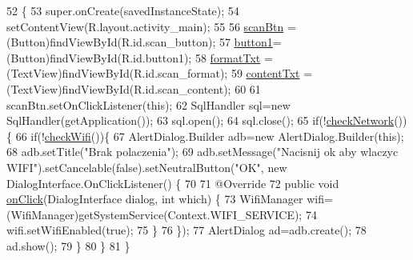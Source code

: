 \begin{DoxyCode}
52                                                        \{
53         super.onCreate(savedInstanceState);
54         setContentView(R.layout.activity\_main);
55         
56         \hyperlink{classcom_1_1example_1_1qrpoll_1_1_main_activity_a24aa61710d9b421c0d23ab545b4f8b99}{scanBtn} = (Button)findViewById(R.id.scan\_button);
57         \hyperlink{classcom_1_1example_1_1qrpoll_1_1_main_activity_a3c62b040921525ab5c9944e97e08f639}{button1}=(Button)findViewById(R.id.button1);
58         \hyperlink{classcom_1_1example_1_1qrpoll_1_1_main_activity_ac2f96df8bbad653bdd8630d749a23ddc}{formatTxt} = (TextView)findViewById(R.id.scan\_format);
59         \hyperlink{classcom_1_1example_1_1qrpoll_1_1_main_activity_aee6c7adea75224ec647353db3ca58124}{contentTxt} = (TextView)findViewById(R.id.scan\_content);
60         
61         scanBtn.setOnClickListener(\textcolor{keyword}{this});
62         SqlHandler sql=\textcolor{keyword}{new} SqlHandler(getApplication());
63         sql.open();
64         sql.close();
65         \textcolor{keywordflow}{if}(!\hyperlink{classcom_1_1example_1_1qrpoll_1_1_main_activity_af92255e3a196405eeb55e06bb625d435}{checkNetwork}())\{
66             \textcolor{keywordflow}{if}(!\hyperlink{classcom_1_1example_1_1qrpoll_1_1_main_activity_a0433b5df97dcca7db8593f32d8d033b9}{checkWifi}())\{
67                 AlertDialog.Builder adb=\textcolor{keyword}{new} AlertDialog.Builder(\textcolor{keyword}{this});
68                 adb.setTitle(\textcolor{stringliteral}{"Brak polaczenia"});
69                 adb.setMessage(\textcolor{stringliteral}{"Nacisnij ok aby wlaczyc WIFI"}).setCancelable(\textcolor{keyword}{false}).setNeutralButton(\textcolor{stringliteral}{"OK"}, \textcolor{keyword}{
      new} DialogInterface.OnClickListener() \{
70                     
71                     @Override
72                     \textcolor{keyword}{public} \textcolor{keywordtype}{void} \hyperlink{classcom_1_1example_1_1qrpoll_1_1_main_activity_a400e30efc907d9726298482730d4243d}{onClick}(DialogInterface dialog, \textcolor{keywordtype}{int} which) \{
73                         WifiManager wifi=(WifiManager)getSystemService(Context.WIFI\_SERVICE);
74                         wifi.setWifiEnabled(\textcolor{keyword}{true});
75                     \}
76                 \});
77                 AlertDialog ad=adb.create();
78                 ad.show();
79             \}
80         \}
81     \}
\end{DoxyCode}


